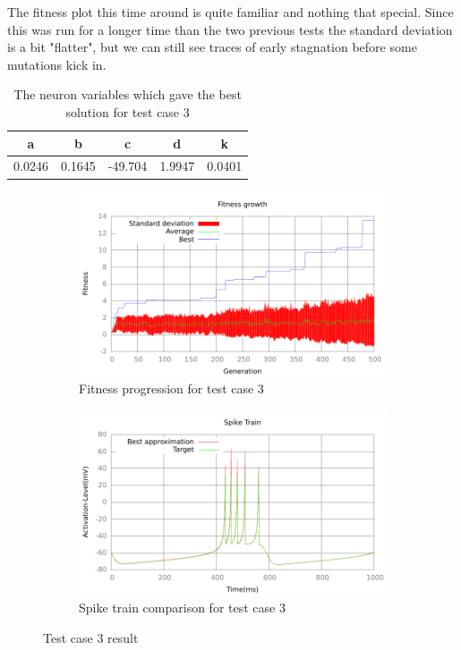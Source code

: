 The fitness plot this time around is quite familiar and nothing that special.
Since this was run for a longer time than the two previous tests the standard
deviation is a bit "flatter", but we can still see traces of early stagnation
before some mutations kick in.
\begin{table}
	\begin{tabular}{c c c c c}
		a & b & c & d & k \\
		\hline
		0.0246 & 0.1645 & -49.704 & 1.9947 & 0.0401
	\end{tabular}
	\caption{The neuron variables which gave the best solution for test case
	3}
\end{table}
\begin{figure}[h]
	\centering
	\begin{subfigure}[b]{0.5\textwidth}
		\includegraphics[width=\textwidth]{../output/wdm_izzy_1_fitness.pdf}
		\caption{Fitness progression for test case 3}
		\label{fig:fitness-test-case-3}
	\end{subfigure}%
	\begin{subfigure}[b]{0.5\textwidth}
		\includegraphics[width=\textwidth]{../output/wdm_izzy_1_spike.pdf}
		\caption{Spike train comparison for test case 3}
		\label{fig:spike-test-case-3}
	\end{subfigure}
	\caption{Test case 3 result}
\end{figure}

